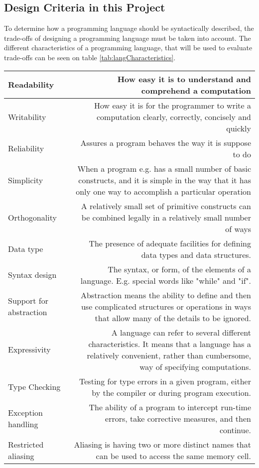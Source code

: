 \subsection{Design Criteria in this Project}
\label{sec:DesignCriteria}
To determine how a programming language should be syntactically described, the trade-offs of designing a programming language must be taken into account. The different characteristics of a programming language, that will be used to evaluate trade-offs can be seen on table \ref{tab:langCharacteristics}.
\begin{table}[H]
	\begin{tabularx}{\textwidth}{|l|R|}
		\hline
		
		Readability				& How easy it is to understand and comprehend a computation 		\\ \hline
		Writability				& How easy it is for the programmer to write a computation clearly, correctly, concisely and quickly\\ \hline
		Reliability 			& Assures a program behaves the way it is suppose to do	\\ \hline
		Simplicity				& When a program e.g. has a small number of basic constructs, and it is simple in the way that it has only one way to 									accomplish a particular operation\\ \hline
		Orthogonality 			& A relatively small set of primitive constructs can be combined legally in a relatively small number of ways\\ \hline	
		Data type				& The presence of adequate facilities for defining data types and data structures.\\ \hline
		Syntax design			& The syntax, or form, of the elements of a language. E.g. special words like "while" and "if".\\ \hline
		Support for abstraction	& Abstraction means the ability to define and then use complicated structures or operations in ways that allow many of the 									details	to be ignored.\\ \hline
		Expressivity			& A language can refer to several different characteristics. It means that a language has a relatively convenient, rather 									than cumbersome, way of specifying computations.\\ \hline
		Type Checking			& Testing for type errors in a given program, either by the compiler or during program execution.\\ \hline
		Exception handling		& The ability of a program to intercept run-time errors, take corrective measures, and then continue.\\ \hline
		Restricted aliasing		& Aliasing is having two or more distinct names that can be used to	access the same memory cell.\\ \hline
		

\end{tabularx}
\end{table}

